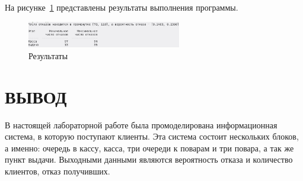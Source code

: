 На рисунке~\ref{img:results} представлены результаты выполнения программы.
\begin{figure}[H]
    \centering
    \includegraphics[width=0.6\textwidth]{images/scr01.png}
    \caption{Результаты}
    \label{img:results}
\end{figure}

\section*{\hfill{}ВЫВОД\hfill{}}
В настоящей лабораторной работе была промоделирована информационная система, в которую поступают клиенты. Эта система состоит нескольких блоков, а именно: очередь в кассу, касса, три очереди к поварам и три повара, а так же пункт выдачи. Выходными данными являются вероятность отказа и количество клиентов, отказ получивших.
